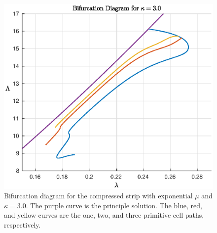 \documentclass[11pt]{report}
\begin{document}
\begin{figure}[!htb]
	\begin{center}
		\includegraphics[scale=0.7]{bif_diagram_3_0}
	\end{center}
	\captionsetup{format=hang}
	\caption{Bifurcation diagram for the compressed strip with exponential $\mu$ and $\kappa = 3.0$. The purple curve is the principle solution. The blue, red, and yellow curves are the one, two, and three primitive cell paths, respectively.}
	\label{fig:bif_diagram_3_0}
\end{figure}
\end{document}
